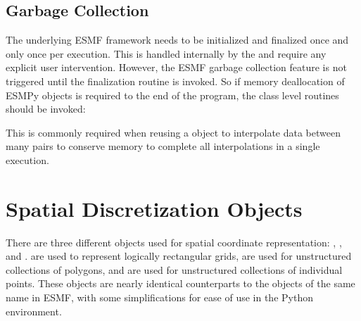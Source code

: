\documentclass[letterpaper,10pt,english]{sphinxmanual}
\begin{document}
\subsection{Garbage Collection}
\label{\detokenize{api:garbage-collection}}
The underlying ESMF framework needs to be initialized and finalized once and
only once per execution. This is handled internally by the
{\hyperref[\detokenize{manager:ESMF.api.esmpymanager.Manager}]{}} and  require any explicit
user intervention. However, the ESMF garbage collection feature is not triggered
until the finalization routine is invoked. So if memory deallocation of ESMPy
objects is required  to the end of the program, the class level
 routines should be invoked:

\begin{sphinxVerbatim}[commandchars=\\\{\}]
  

\end{sphinxVerbatim}

This is commonly required when reusing a {\hyperref[\detokenize{regrid:ESMF.api.regrid.Regrid}]{}} object
to interpolate data between many {\hyperref[\detokenize{field:ESMF.api.field.Field}]{}} pairs to
conserve memory to complete all interpolations in a single execution.


\section{Spatial Discretization Objects}
\label{\detokenize{api:spatial-discretization-objects}}
There are three different objects used for spatial coordinate representation:
{\hyperref[\detokenize{grid:ESMF.api.grid.Grid}]{}}, {\hyperref[\detokenize{mesh:ESMF.api.mesh.Mesh}]{}}, and {\hyperref[\detokenize{locstream:ESMF.api.locstream.LocStream}]{}}. {\hyperref[\detokenize{grid:ESMF.api.grid.Grid}]{}} are used to represent logically rectangular
grids, {\hyperref[\detokenize{mesh:ESMF.api.mesh.Mesh}]{}} are used for unstructured collections of polygons, and
{\hyperref[\detokenize{locstream:ESMF.api.locstream.LocStream}]{}} are used for unstructured collections of individual points. These
objects are nearly identical counterparts to the objects of the same name in
ESMF, with some simplifications for ease of use in the Python environment.
\end{document}
